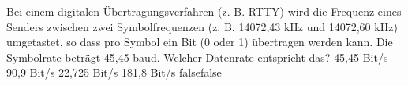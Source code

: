     {Bei einem digitalen Übertragungsverfahren (z. B. RTTY) wird die Frequenz eines Senders zwischen zwei Symbolfrequenzen (z. B. 14072,43 kHz und 14072,60 kHz) umgetastet, so dass pro Symbol ein Bit (0 oder 1) übertragen werden kann. Die Symbolrate beträgt 45,45 baud. Welcher Datenrate entspricht das?}
    {45,45 Bit/s}
    {90,9 Bit/s}
    {22,725 Bit/s}
    {181,8 Bit/s}
    {false}{false}